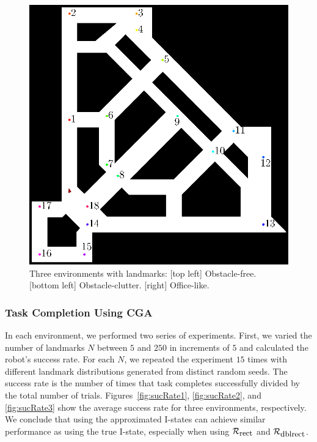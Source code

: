 \begin{figure}
\begin{minipage}[b]{0.45\textwidth}
    \includegraphics[scale=0.65]{figs/office}    
  \end{minipage}
  \caption{Three environments with landmarks: [top left] Obstacle-free. [bottom
    left] Obstacle-clutter. [right] Office-like.}
  \label{fig:env}
\end{figure}

\subsubsection{Task Completion Using CGA}
In each environment, we performed two series of experiments. 
%
First, we varied the number of landmarks $N$ between $5$ and $250$ in increments of $5$ and calculated the
robot's success rate.  
%
For each $N$, we repeated the experiment $15$ times with different landmark distributions generated from distinct random seeds. 
%
The success rate is the number of times that task completes successfully divided by
the total number of trials.  
%
Figures~\ref{fig:sucRate1}, \ref{fig:sucRate2}, and \ref{fig:sucRate3} show the average success rate for three environments, respectively. 
%
We conclude that using the approximated I-states can achieve similar performance as using the true I-state, 
especially when using $\mathcal{R}_{\mbox{\small rect}}$ and $\mathcal{R}_{\mbox{\small dblrect}}$.

